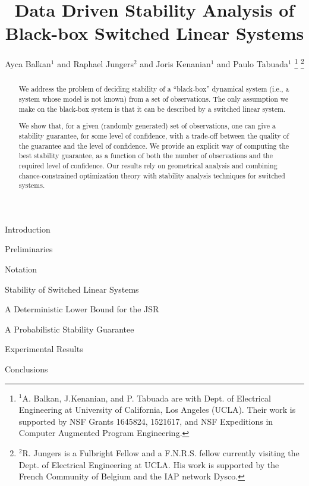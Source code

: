 \documentclass[letterpaper, 10 pt, conference]{ieeeconf}
\title{Data Driven Stability Analysis of Black-box Switched Linear Systems}
\author{Ayca Balkan$^{1}$ and Raphael Jungers$^{2}$ and Joris Kenanian$^{1}$ and Paulo Tabuada$^{1}$ 
\thanks{$^{1}$A. Balkan, J.Kenanian, and P. Tabuada are with Dept. of Electrical Engineering at University of California, Los Angeles (UCLA). Their work is supported by NSF Grants 1645824, 1521617, and NSF Expeditions in Computer Augmented Program Engineering.}
\thanks{$^{2}$R. Jungers is a Fulbright Fellow and a F.N.R.S. fellow currently visiting the Dept. of
Electrical Engineering at UCLA. His work is supported by the French Community of Belgium and the IAP network Dysco.}}
\begin{document}
\maketitle

\begin{abstract}
We address the problem of deciding stability of a ``black-box'' dynamical system (i.e., a system whose model is not known) from a set of observations. The only assumption we make on the black-box system is that it can be described by a switched linear system. 

We show that, for a given (randomly generated) set of observations, one can give a stability guarantee, for some level of confidence, with a trade-off between the quality of the guarantee and the level of confidence. We provide an explicit way of computing the best stability guarantee, as a function of both the number of observations and the required level of confidence. Our results rely on geometrical analysis and combining chance-constrained optimization theory with stability analysis techniques for switched systems.
\end{abstract}

\begin{section}{Introduction}

\end{section}

\begin{section}{Preliminaries}
\label{sec:preliminaries}
\begin{subsection}{Notation}
 
\end{subsection}
\begin{subsection}{Stability of Switched Linear Systems}

\end{subsection}
\end{section}

\begin{section}{A Deterministic Lower Bound for the JSR}
\label{sec:lowerbound}

\end{section}

\begin{section}{A Probabilistic Stability Guarantee}
\label{sec:upperbound}



%
%
%
\end{section}

\begin{section}{Experimental Results}
\label{sec:experiments}

\end{section}

\begin{section}{Conclusions}
\label{sec:conclusions}

\end{section}

\appendix
\label{appendix}






\end{document}
